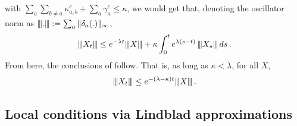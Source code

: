 \documentclass[aps,pra,amsmath,amssymb,twocolumn,10pt]{revtex4-2}
\newcommand{\vertiii}[1]{{\left\vert\kern-0.25ex\left\vert\kern-0.25ex\left\vert #1 
    \right\vert\kern-0.25ex\right\vert\kern-0.25ex\right\vert}}
\theoremstyle{definition}
\begin{document}
with $\sum_a\sum_{b\ne a}\kappa_{a,b}^c+\sum_a \gamma_a^c\le \kappa $, we would get that, denoting the oscillator norm as $\vertiii{.}:=\sum_a \|\delta_a(.)\|_\infty$,
\begin{align}
	\vertiii{X_t}\le e^{-\lambda t}\vertiii{X}+\kappa\int_0^t e^{\lambda(s-t)}\,  \vertiii{X_s}\,ds\,.
\end{align}
From here, the conclusions of \cite{Majewski1995,temme2015fast} follow. That is, as long as $\kappa<\lambda$, for all $X$,
\begin{align}
	\vertiii{X_t}\le e^{-(\lambda-\kappa)t}\vertiii{X}\,.
\end{align}

\subsection{Local conditions via Lindblad approximations}
\end{document}
